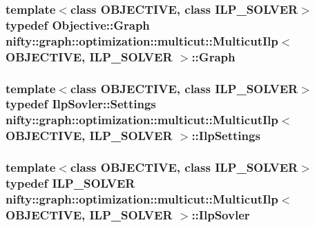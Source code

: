 \subsubsection[{Graph}]{\setlength{\rightskip}{0pt plus 5cm}template$<$class O\+B\+J\+E\+C\+T\+I\+V\+E, class I\+L\+P\+\_\+\+S\+O\+L\+V\+E\+R$>$ typedef Objective\+::\+Graph {\bf nifty\+::graph\+::optimization\+::multicut\+::\+Multicut\+Ilp}$<$ O\+B\+J\+E\+C\+T\+I\+V\+E, I\+L\+P\+\_\+\+S\+O\+L\+V\+E\+R $>$\+::{\bf Graph}}\label{classnifty_1_1graph_1_1optimization_1_1multicut_1_1MulticutIlp_a98f6b00c67ccecf9e2c5ad63d8d2bade}
\hypertarget{classnifty_1_1graph_1_1optimization_1_1multicut_1_1MulticutIlp_a61b515766e63459084d16525e62c527d}{}
\subsubsection[{Ilp\+Settings}]{\setlength{\rightskip}{0pt plus 5cm}template$<$class O\+B\+J\+E\+C\+T\+I\+V\+E, class I\+L\+P\+\_\+\+S\+O\+L\+V\+E\+R$>$ typedef Ilp\+Sovler\+::\+Settings {\bf nifty\+::graph\+::optimization\+::multicut\+::\+Multicut\+Ilp}$<$ O\+B\+J\+E\+C\+T\+I\+V\+E, I\+L\+P\+\_\+\+S\+O\+L\+V\+E\+R $>$\+::{\bf Ilp\+Settings}}\label{classnifty_1_1graph_1_1optimization_1_1multicut_1_1MulticutIlp_a61b515766e63459084d16525e62c527d}
\hypertarget{classnifty_1_1graph_1_1optimization_1_1multicut_1_1MulticutIlp_ac85f089fd12431bd80f33c83dd45bdc7}{}
\subsubsection[{Ilp\+Sovler}]{\setlength{\rightskip}{0pt plus 5cm}template$<$class O\+B\+J\+E\+C\+T\+I\+V\+E, class I\+L\+P\+\_\+\+S\+O\+L\+V\+E\+R$>$ typedef I\+L\+P\+\_\+\+S\+O\+L\+V\+E\+R {\bf nifty\+::graph\+::optimization\+::multicut\+::\+Multicut\+Ilp}$<$ O\+B\+J\+E\+C\+T\+I\+V\+E, I\+L\+P\+\_\+\+S\+O\+L\+V\+E\+R $>$\+::{\bf Ilp\+Sovler}}\label{classnifty_1_1graph_1_1optimization_1_1multicut_1_1MulticutIlp_ac85f089fd12431bd80f33c83dd45bdc7}
\hypertarget{classnifty_1_1graph_1_1optimization_1_1multicut_1_1MulticutIlp_a0b5224bc8998dda829c920e8d3338fee}{}
